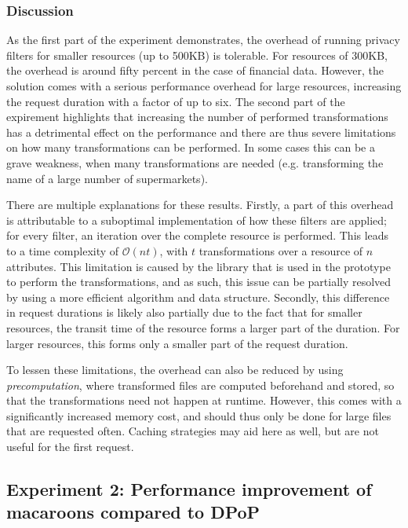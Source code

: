 \newpage





\subsubsection{Discussion}
As the first part of the experiment demonstrates, the overhead of running privacy filters for smaller resources (up to 500KB) is tolerable. For resources of 300KB, the overhead is around fifty percent in the case of financial data. However, the solution comes with a serious performance overhead for large resources, increasing the request duration with a factor of up to six. The second part of the expirement highlights that increasing the number of performed transformations has a detrimental effect on the performance and there are thus severe limitations on how many transformations can be performed. In some cases this can be a grave weakness, when many transformations are needed (e.g. transforming the name of a large number of supermarkets).

There are multiple explanations for these results. Firstly, a part of this overhead is attributable to a suboptimal implementation of how these filters are applied; for every filter, an iteration over the complete resource is performed. This leads to a time complexity of $\mathcal{O}(nt)$, with $t$ transformations over a resource of $n$ attributes. This limitation is caused by the library that is used in the prototype to perform the transformations, and as such, this issue can be partially resolved by using a more efficient algorithm and data structure. Secondly, this difference in request durations is likely also partially due to the fact that for smaller resources, the transit time of the resource forms a larger part of the duration. For larger resources, this forms only a smaller part of the request duration.

To lessen these limitations, the overhead can also be reduced by using \textit{precomputation}, where transformed files are computed beforehand and stored, so that the transformations need not happen at runtime. However, this comes with a significantly increased memory cost, and should thus only be done for large files that are requested often. Caching strategies may aid here as well, but are not useful for the first request. 


\newpage
\subsection{Experiment 2: Performance improvement of macaroons compared to DPoP}
\label{sec:macaroons-performance}

